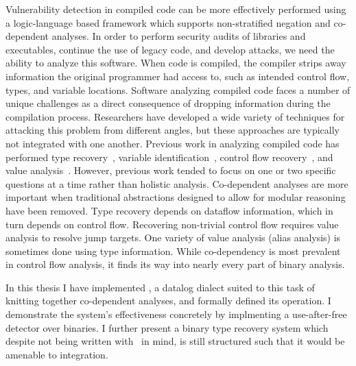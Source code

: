 Vulnerability detection in compiled code can be more effectively performed using a logic-language based framework which supports non-stratified negation and co-dependent analyses.
In order to perform security audits of libraries and executables, continue the use of legacy code, and develop attacks, we need the ability to analyze this software.
When code is compiled, the compiler strips away information the original programmer had access to, such as intended control flow, types, and variable locations.
Software analyzing compiled code faces a number of unique challenges as a direct consequence of dropping information during the compilation process.
Researchers have developed a wide variety of techniques for attacking this problem from different angles, but these approaches are typically not integrated with one another.
Previous work in analyzing compiled code has performed type recovery~\cite{bitr}, variable identification~\cite{divine}, control flow recovery~\cite{jakstab,phoenix}, and value analysis~\cite{vsa}.
However, previous work tended to focus on one or two specific questions at a time rather than holistic analysis.
Co-dependent analyses are more important when traditional abstractions designed to allow for modular reasoning have been removed.
Type recovery depends on dataflow information\cite{bitr,tie,sndwrite}, which in turn depends on control flow.
Recovering non-trivial control flow requires value analysis to resolve jump targets.
One variety of value analysis (alias analysis) is sometimes done using type information.
While co-dependency is most prevalent in control flow analysis, it finds its way into nearly every part of binary analysis.

In this thesis I have implemented \sysname, a datalog dialect suited to this task of knitting together co-dependent analyses, and formally defined its operation.
I demonstrate the system's effectiveness concretely by implmenting a use-after-free detector over binaries.
I further present a binary type recovery system which despite not being written with \sysname\ in mind, is still structured such that it would be amenable to integration.
